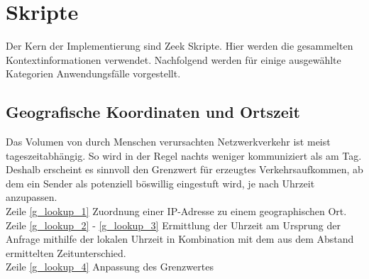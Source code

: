 \section{Skripte}
Der Kern der Implementierung sind Zeek Skripte. Hier werden die gesammelten Kontextinformationen verwendet. Nachfolgend werden für einige ausgewählte Kategorien Anwendungsfälle vorgestellt.
\subsection{Geografische Koordinaten und Ortszeit}
Das Volumen von durch Menschen verursachten Netzwerkverkehr ist meist tageszeitabhängig. So wird in der Regel nachts weniger kommuniziert als am Tag. Deshalb erscheint es sinnvoll den Grenzwert für erzeugtes Verkehrsaufkommen, ab dem ein Sender als potenziell böswillig eingestuft wird, je nach Uhrzeit anzupassen.\\
Zeile \ref{g_lookup_1} Zuordnung einer IP-Adresse zu einem geographischen Ort.\\
Zeile \ref{g_lookup_2} - \ref{g_lookup_3} Ermittlung der Uhrzeit am Ursprung der Anfrage mithilfe der lokalen Uhrzeit in Kombination mit dem aus dem Abstand ermittelten Zeitunterschied.\\
Zeile \ref{g_lookup_4} Anpassung des Grenzwertes\\
